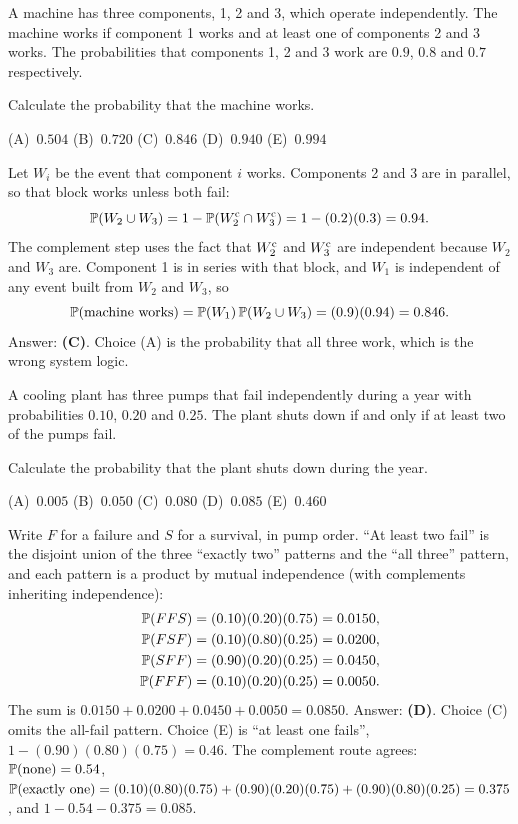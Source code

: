 \begin{example}
A machine has three components, 1, 2 and 3, which operate independently. The machine works if component 1 works and at least one of components 2 and 3 works. The probabilities that components 1, 2 and 3 work are $0.9$, $0.8$ and $0.7$ respectively.

Calculate the probability that the machine works.

\begin{center}
(A)~$0.504$ \quad (B)~$0.720$ \quad (C)~$0.846$ \quad (D)~$0.940$ \quad (E)~$0.994$
\end{center}
\end{example}
\begin{solution}
Let $W_i$ be the event that component $i$ works. Components 2 and 3 are in parallel, so that block works unless both fail:
\[
\mathbb{P}(W_2 \cup W_3) = 1 - \mathbb{P}(W_2^{\mathrm{c}} \cap W_3^{\mathrm{c}}) = 1 - (0.2)(0.3) = 0.94.
\]
The complement step uses the fact that $W_2^{\mathrm{c}}$ and $W_3^{\mathrm{c}}$ are independent because $W_2$ and $W_3$ are. Component 1 is in series with that block, and $W_1$ is independent of any event built from $W_2$ and $W_3$, so
\[
\mathbb{P}(\text{machine works}) = \mathbb{P}(W_1)\,\mathbb{P}(W_2 \cup W_3) = (0.9)(0.94) = 0.846.
\]
Answer: \textbf{(C)}. Choice (A) is the probability that all three work, which is the wrong system logic.
\end{solution}

\begin{example}
A cooling plant has three pumps that fail independently during a year with probabilities $0.10$, $0.20$ and $0.25$. The plant shuts down if and only if at least two of the pumps fail.

Calculate the probability that the plant shuts down during the year.

\begin{center}
(A)~$0.005$ \quad (B)~$0.050$ \quad (C)~$0.080$ \quad (D)~$0.085$ \quad (E)~$0.460$
\end{center}
\end{example}
\begin{solution}
Write $F$ for a failure and $S$ for a survival, in pump order. ``At least two fail'' is the disjoint union of the three ``exactly two'' patterns and the ``all three'' pattern, and each pattern is a product by mutual independence (with complements inheriting independence):
\begin{align*}
\mathbb{P}(FFS) &= (0.10)(0.20)(0.75) = 0.0150, \\
\mathbb{P}(FSF) &= (0.10)(0.80)(0.25) = 0.0200, \\
\mathbb{P}(SFF) &= (0.90)(0.20)(0.25) = 0.0450, \\
\mathbb{P}(FFF) &= (0.10)(0.20)(0.25) = 0.0050.
\end{align*}
The sum is $0.0150 + 0.0200 + 0.0450 + 0.0050 = 0.0850$. Answer: \textbf{(D)}. Choice (C) omits the all-fail pattern. Choice (E) is ``at least one fails'', $1 - (0.90)(0.80)(0.75) = 0.46$. The complement route agrees: $\mathbb{P}(\text{none}) = 0.54$, $\mathbb{P}(\text{exactly one}) = (0.10)(0.80)(0.75) + (0.90)(0.20)(0.75) + (0.90)(0.80)(0.25) = 0.375$, and $1 - 0.54 - 0.375 = 0.085$.
\end{solution}

